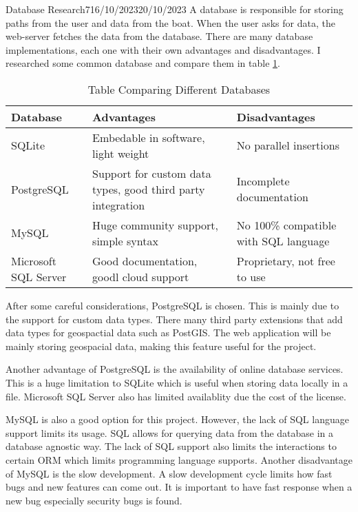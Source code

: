 \documentclass[12pt]{article}
\begin{document}
\begin{logbook-entry}{Database Research}{7}{16/10/2023}{20/10/2023}
A database is responsible for storing paths from the user and data from the boat.
When the user asks for data, the web-server fetches the data from the database.
There are many database implementations, each one with their own advantages and disadvantages.
I researched some common database and compare them in table \ref{tab:db-comparison}.

\begin{table}[H]
    \centering{}
    \caption{Table Comparing Different Databases}
    \label{tab:db-comparison}
    \begin{tabularx}{\textwidth}{m{5em} X X}
        \hline
        Database & Advantages & Disadvantages\\
        \hline
        SQLite & Embedable in software, light weight & No parallel insertions\\
        PostgreSQL & Support for custom data types, good third party integration & Incomplete documentation\\
        MySQL & Huge community support, simple syntax & No 100\% compatible with SQL language\\
        Microsoft SQL Server  & Good documentation, goodl cloud support & Proprietary, not free to use\\
        \hline
    \end{tabularx}
\end{table}

After some careful considerations, PostgreSQL is chosen.
This is mainly due to the support for custom data types.
There many third party extensions that add data types for geospactial data such as PostGIS.
The web application will be mainly storing geospacial data, making this feature useful for the project.

Another advantage of PostgreSQL is the availability of online database services.
This is a huge limitation to SQLite which is useful when storing data locally in a file.
Microsoft SQL Server also has limited availablity due the cost of the license.

MySQL is also a good option for this project.
However, the lack of SQL language support limits its usage.
SQL allows for querying data from the database in a database agnostic way.
The lack of SQL support also limits the interactions to certain ORM which limits programming language supports.
Another disadvantage of MySQL is the slow development.
A slow development cycle limits how fast bugs and new features can come out.
It is important to have fast response when a new bug especially security bugs is found.
\end{logbook-entry}
\end{document}
